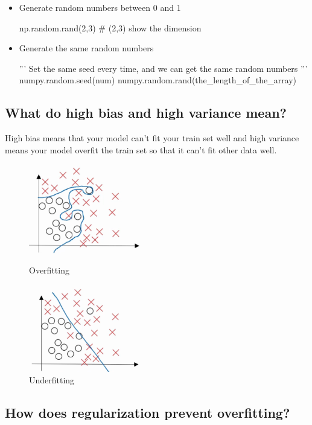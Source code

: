 \documentclass{article}
\begin{document}
\begin{enumerate}
\begin{itemize}
\item Generate random numbers between 0 and 1
\begin{python}
np.random.rand(2,3) # (2,3) show the dimension
\end{python}

\item Generate the same random numbers
\begin{python}
'''
Set the same seed every time,
and we can get the same random numbers
'''
numpy.random.seed(num)
numpy.random.rand(the_length_of_the_array)
\end{python}

\end{itemize}


\end{enumerate} 

\subsection{What do high bias and high variance mean?}
\indent High bias means that your model can't fit your train set well and high variance means your model overfit the train set so that it can't fit other data well.

\begin{figure}[htbp]

\begin{minipage}[t]{0.45\linewidth}
\centering
\includegraphics[width=5cm]{overfit.png}
\caption{Overfitting}
\label{overfitting}
\end{minipage}
\hfill
\begin{minipage}[t]{0.45\linewidth}
\centering
\includegraphics[width=5cm]{underfitting.png}
\caption{Underfitting}
\label{underfitting}
\end{minipage}
\end{figure}

\subsection{How does regularization prevent overfitting?}
\end{document}
